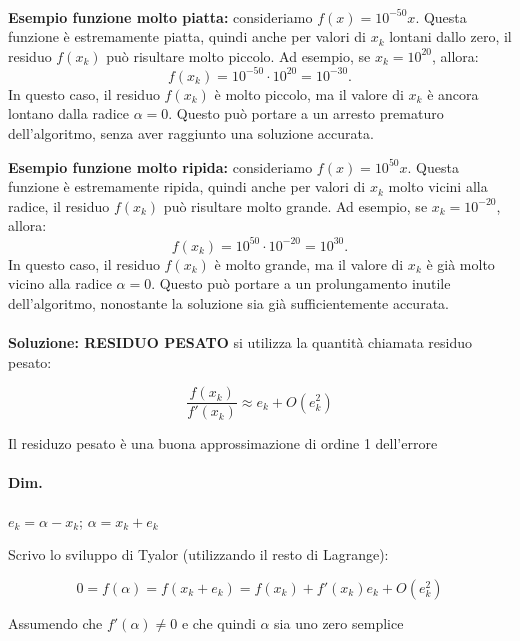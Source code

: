 \documentclass[a4paper, 11pt]{article}
\begin{document}
        \paragraph{}
        \textbf{Esempio funzione molto piatta:} consideriamo \( f(x) = 10^{-50}x \). Questa funzione è estremamente piatta, quindi anche per valori di \( x_k \) lontani dallo zero, il residuo \( f(x_k) \) può risultare molto piccolo. Ad esempio, se \( x_k = 10^{20} \), allora:
        \[
            f(x_k) = 10^{-50} \cdot 10^{20} = 10^{-30}.
        \]
        In questo caso, il residuo \( f(x_k) \) è molto piccolo, ma il valore di \( x_k \) è ancora lontano dalla radice \( \alpha = 0 \). Questo può portare a un arresto prematuro dell'algoritmo, senza aver raggiunto una soluzione accurata.

        \textbf{Esempio funzione molto ripida:} consideriamo \( f(x) = 10^{50}x \). Questa funzione è estremamente ripida, quindi anche per valori di \( x_k \) molto vicini alla radice, il residuo \( f(x_k) \) può risultare molto grande. Ad esempio, se \( x_k = 10^{-20} \), allora:
        \[
            f(x_k) = 10^{50} \cdot 10^{-20} = 10^{30}.
        \]
        In questo caso, il residuo \( f(x_k) \) è molto grande, ma il valore di \( x_k \) è già molto vicino alla radice \( \alpha = 0 \). Questo può portare a un prolungamento inutile dell'algoritmo, nonostante la soluzione sia già sufficientemente accurata.

        \paragraph{}
        \textbf{Soluzione: RESIDUO PESATO }
        si utilizza la quantità chiamata residuo pesato:

        \[
            \frac{f(x_k)}{f'(x_k)} \approx e_k + O(e_k^2) 
        \]

        Il residuzo pesato è una buona approssimazione di ordine 1 dell'errore
        
        \paragraph{Dim. } $e_k = \alpha - x_k$; \quad $\alpha = x_k + e_k$ 
        
        Scrivo lo sviluppo di Tyalor (utilizzando il resto di Lagrange): 

        \[
            0 = f(\alpha) = f(x_k + e_k) = f(x_k) + f'(x_k)e_k + O(e_k^2) 
        \]

        Assumendo che $f'(\alpha) \ne 0$ e che quindi $\alpha$ sia uno zero semplice
        
\end{document}
